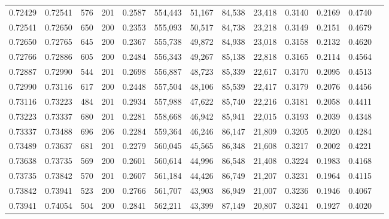\begin{tabular}{rrrrrrrrrrrrr}
0.72429 & 0.72541 &   576 & 201 &                                     0.2587 & 554,443 &  51,167 &  84,538 &  23,418 & 0.3140 & 0.2169 & 0.4740 \\
0.72541 & 0.72650 &   650 & 200 &                                     0.2353 & 555,093 &  50,517 &  84,738 &  23,218 & 0.3149 & 0.2151 & 0.4679 \\
0.72650 & 0.72765 &   645 & 200 &                                     0.2367 & 555,738 &  49,872 &  84,938 &  23,018 & 0.3158 & 0.2132 & 0.4620 \\
0.72766 & 0.72886 &   605 & 200 &                                     0.2484 & 556,343 &  49,267 &  85,138 &  22,818 & 0.3165 & 0.2114 & 0.4564 \\
0.72887 & 0.72990 &   544 & 201 &                                     0.2698 & 556,887 &  48,723 &  85,339 &  22,617 & 0.3170 & 0.2095 & 0.4513 \\
0.72990 & 0.73116 &   617 & 200 &                                     0.2448 & 557,504 &  48,106 &  85,539 &  22,417 & 0.3179 & 0.2076 & 0.4456 \\
0.73116 & 0.73223 &   484 & 201 &                                     0.2934 & 557,988 &  47,622 &  85,740 &  22,216 & 0.3181 & 0.2058 & 0.4411 \\
0.73223 & 0.73337 &   680 & 201 &                                     0.2281 & 558,668 &  46,942 &  85,941 &  22,015 & 0.3193 & 0.2039 & 0.4348 \\
0.73337 & 0.73488 &   696 & 206 &                                     0.2284 & 559,364 &  46,246 &  86,147 &  21,809 & 0.3205 & 0.2020 & 0.4284 \\
0.73489 & 0.73637 &   681 & 201 &                                     0.2279 & 560,045 &  45,565 &  86,348 &  21,608 & 0.3217 & 0.2002 & 0.4221 \\
0.73638 & 0.73735 &   569 & 200 &                                     0.2601 & 560,614 &  44,996 &  86,548 &  21,408 & 0.3224 & 0.1983 & 0.4168 \\
0.73735 & 0.73842 &   570 & 201 &                                     0.2607 & 561,184 &  44,426 &  86,749 &  21,207 & 0.3231 & 0.1964 & 0.4115 \\
0.73842 & 0.73941 &   523 & 200 &                                     0.2766 & 561,707 &  43,903 &  86,949 &  21,007 & 0.3236 & 0.1946 & 0.4067 \\
0.73941 & 0.74054 &   504 & 200 &                                     0.2841 & 562,211 &  43,399 &  87,149 &  20,807 & 0.3241 & 0.1927 & 0.4020 \\

\end{tabular}
